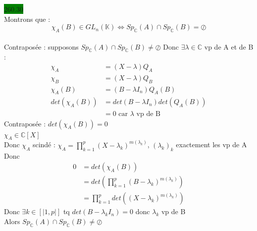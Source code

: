 \documentclass{article}
\begin{document}
\noindent \colorbox{green}{260.30}\\
Montrons que : \begin{equation*}
    \chi_A(B) \in GL_n(\mathbb{K}) \Leftrightarrow Sp_\mathbb{C}(A)\cap Sp_\mathbb{C}(B) = \oslash 
\end{equation*}\\
\fbox{\(\Rightarrow\)} Contraposée : supposons \(Sp_\mathbb{C}(A)\cap Sp_\mathbb{C}(B) \neq \oslash \)
Donc \(\exists \lambda \in \mathbb{C}\) vp de A et de B : \begin{align*}
    \chi_A &= (X-\lambda)Q_A\\
    \chi_B &= (X-\lambda)Q_B\\
    \chi_A(B) &= (B-\lambda I_n)Q_A(B)\\
    det(\chi_A(B)) &= det(B-\lambda I_n)det(Q_A(B))\\
    &= 0 \text{ car \(\lambda\) vp de B}
\end{align*}
\fbox{\(\Leftarrow\)} Contraposée : \(det(\chi_A(B)) = 0\) \\
\(\chi_A \in \mathbb{C}[X]\)\\
Donc \(\chi_A\) scindé : \(\chi_A = \prod_{k=1}^{p}(X-\lambda_k)^{m(\lambda_k)}\), 
\((\lambda_k)_k\) exactement les vp de A\\
Donc \begin{align*}
    0 &= det(\chi_A(B))\\
    &= det(\prod_{k=1}^{p}(B-\lambda_k)^{m(\lambda_k)})\\
    &= \prod_{k=1}^{p}det((X-\lambda_k)^{m(\lambda_k)})
\end{align*}
Donc \(\exists k \in [|1,p|]\) tq \(det(B-\lambda_k I_n) = 0\)
donc \(\lambda_k\) vp de B \\
Alors \(Sp_\mathbb{C}(A)\cap Sp_\mathbb{C}(B) \neq \oslash \)
\end{document}
